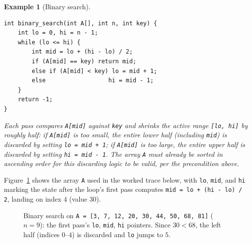 \documentclass[11pt]{article}
\newtheorem{example}{Example}[section]
\begin{document}
\begin{example}[Binary search]
\begin{verbatim}
int binary_search(int A[], int n, int key) {
    int lo = 0, hi = n - 1;
    while (lo <= hi) {
        int mid = lo + (hi - lo) / 2;
        if (A[mid] == key) return mid;
        else if (A[mid] < key) lo = mid + 1;
        else                  hi = mid - 1;
    }
    return -1;
}
\end{verbatim}
Each pass compares \texttt{A[mid]} against \texttt{key} and shrinks the
active range \texttt{[lo, hi]} by roughly half: if \texttt{A[mid]} is too
small, the entire lower half (including \texttt{mid}) is discarded by
setting \texttt{lo = mid + 1}; if \texttt{A[mid]} is too large, the entire
upper half is discarded by setting \texttt{hi = mid - 1}. The array
\texttt{A} must already be sorted in ascending order for this discarding
logic to be valid, per the precondition above.
\end{example}

Figure~\ref{fig:halving} shows the array \texttt{A} used in the worked trace
below, with \texttt{lo}, \texttt{mid}, and \texttt{hi} marking the state
after the loop's first pass computes \texttt{mid = lo + (hi - lo) / 2},
landing on index $4$ (value $30$).

\begin{figure}[h]
  \centering
  \caption{Binary search on \texttt{A = [3, 7, 12, 20, 30, 44, 50, 68, 81]}
  ($n=9$): the first pass's \texttt{lo}, \texttt{mid}, \texttt{hi} pointers.
  Since $30 < 68$, the left half (indices $0$--$4$) is discarded and
  \texttt{lo} jumps to $5$.}
  \label{fig:halving}
\end{figure}
\end{document}
